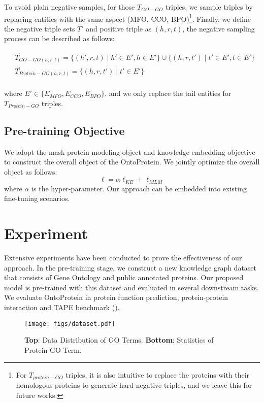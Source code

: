 To avoid plain negative samples, for those $T_{GO-GO}$ triples, we sample triples by replacing entities with the same aspect (MFO, CCO, BPO)\footnote{For $T_{protein-GO}$ triples, it is also intuitive to replace the proteins with their homologous proteins to generate hard negative triples, and we leave this for future works.}. 
Finally, we define the negative triple sets $T'$ and {\color{highlight} positive triple as $(h, r, t)$, the negative sampling process can be described as follows}:
{\color{highlight}
\begin{equation}
\begin{aligned}
&T_{GO-GO (h,r,t)}^{'}=\{(h',r,t)\mid h'\in E', h\in E' \} \cup \{ (h,r,t')\mid t'\in E', t\in E' \}
\\
&T_{Protein-GO (h,r,t)}^{'} = \{ (h,r,t')\mid t'\in E' \}
\\
\end{aligned}
\end{equation}

where $ E' \in \{ E_{MFO}, E_{CCO}, E_{BPO} \}$, and we only replace the tail entities for  $T_{Protein-GO}$ triples.
}

\subsection{Pre-training Objective}
We adopt the mask protein modeling object and knowledge embedding objective to construct the overall object of the OntoProtein.
We jointly optimize the overall object as follows:
\begin{equation}
\ell = \alpha \ell_{KE} + \ell_{MLM}
\end{equation}
where $\alpha$ is the hyper-parameter. 
Our approach can be embedded into existing fine-tuning scenarios.
 
\section{Experiment}
Extensive experiments have been conducted to prove the effectiveness of our approach.
In the pre-training stage, we construct a new knowledge graph dataset that consists of Gene Ontology and public annotated proteins.
Our proposed model is pre-trained with this dataset and evaluated in several downstream tasks.
We evaluate OntoProtein in protein function prediction, protein-protein interaction and  TAPE benchmark (\cite{DBLP:conf/nips/RaoBTDCCAS19}).

\begin{figure*}[t]
\centering
\texttt{[image: figs/dataset.pdf]}
\caption{\textbf{Top}: Data Distribution of GO Terms. \textbf{Bottom}: Statistics of Protein-GO Term.}
\label{dataset}
\end{figure*}

